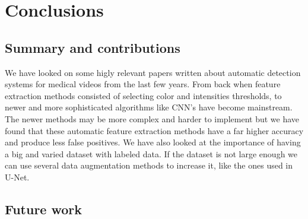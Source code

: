 \documentclass[thesis.tex]{subfiles}
\begin{document}
\chapter{Conclusions} \label{conclusions}


\section{Summary and contributions} \label{summaryandcontributions}
We have looked on some higly relevant papers written about automatic detection systems for medical videos from the last few years. From back when feature extraction methods consisted of selecting color and intensities thresholds, to newer and more sophisticated algorithms like CNN's have become mainstream. The newer methods may be more complex and harder to implement but we have found that these automatic feature extraction methods have a far higher accuracy and produce less false positives. We have also looked at the importance of having a big and varied dataset with labeled data. If the dataset is not large enough we can use several data augmentation methods to increase it, like the ones used in U-Net. 


\section{Future work} \label{futurework} %
\end{document}
